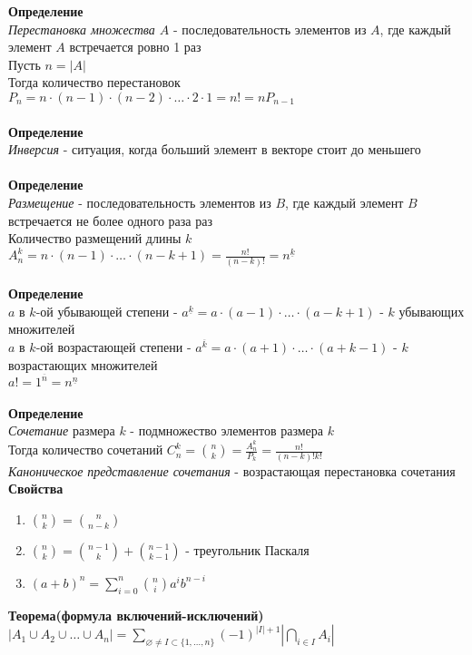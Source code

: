 \documentclass[12pt]{article}
\begin{document}
\textbf{Определение}\\
\textit{Перестановка множества $A$} - последовательность элементов из $A$, где каждый элемент $A$ встречается ровно 1 раз\\
Пусть $n = |A|$\\
Тогда количество перестановок $P_n = n\cdot(n-1)\cdot(n-2)\cdot\ldots\cdot2\cdot1 = n! = nP_{n-1}$\\\\
\textbf{Определение}\\
\textit{Инверсия} - ситуация, когда больший элемент в векторе стоит до меньшего\\\\
\textbf{Определение}\\
\textit{Размещение} - последовательность элементов из $B$, где каждый элемент $B$ встречается не более одного раза раз\\
Количество размещений длины $k$ $A^k_n = n\cdot(n-1)\cdot\ldots\cdot(n-k+1) = \frac{n!}{(n-k)!} = n^{\underline{k}}$\\\\
\textbf{Определение}\\
$a$ в $k$-ой убывающей степени - $a^{\underline{k}} = a\cdot(a-1)\cdot\ldots\cdot(a-k+1)$ - $k$ убывающих множителей\\
$a$ в $k$-ой возрастающей степени - $a^{\overline{k}} = a\cdot(a+1)\cdot\ldots\cdot(a+k-1)$ - $k$ возрастающих множителей\\
$a! = 1^{\overline{n}} = n^{\underline{n}}$\\\\
\textbf{Определение}\\
\textit{Сочетание} размера $k$ - подмножество элементов размера $k$\\
Тогда количество сочетаний $C_n^k = \binom{n}{k} = \frac{A_n^k}{P_k} = \frac{n!}{(n-k)!k!}$\\
\textit{Каноническое представление сочетания} - возрастающая перестановка сочетания\\
\textbf{Свойства}
\begin{enumerate}
    \item $\binom{n}{k} = \binom{n}{n-k}$
    \item $\binom{n}{k} = \binom{n-1}{k} + \binom{n-1}{k-1}$ - треугольник Паскаля
    \item $(a+b)^n = \sum_{i=0}^n \binom{n}{i}a^ib^{n-i}$
\end{enumerate}
\textbf{Теорема(формула включений-исключений)}\\
$|A_1\cup A_2\cup \ldots\cup A_n| = \sum_{\varnothing \neq I \subset \{1,\ldots,n\}} (-1)^{|I|+1}|\bigcap_{i \in I} A_i|$\\
\end{document}
